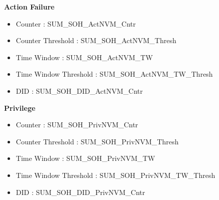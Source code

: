     
    \textbf{Action Failure}
    \begin{itemize}
        \item Counter               : SUM_SOH_ActNVM_Cntr
        \item Counter Threshold     : SUM_SOH_ActNVM_Thresh
        \item Time Window           : SUM_SOH_ActNVM_TW
        \item Time Window Threshold : SUM_SOH_ActNVM_TW_Thresh
        \item DID                   : SUM_SOH_DID_ActNVM_Cntr
    \end{itemize}
    
    \textbf{Privilege}
    \begin{itemize}
        \item Counter               : SUM_SOH_PrivNVM_Cntr
        \item Counter Threshold     : SUM_SOH_PrivNVM_Thresh
        \item Time Window           : SUM_SOH_PrivNVM_TW
        \item Time Window Threshold : SUM_SOH_PrivNVM_TW_Thresh
        \item DID                   : SUM_SOH_DID_PrivNVM_Cntr
    \end{itemize}
    

{}
{}
{ }


